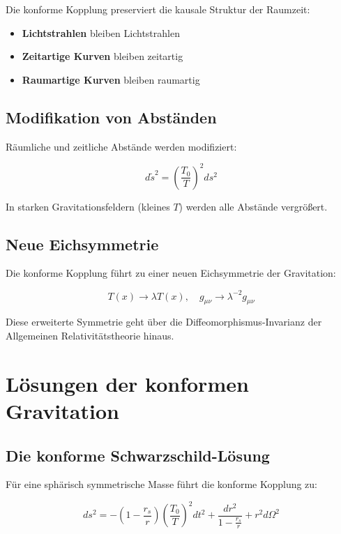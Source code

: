 \documentclass[12pt,a4paper]{report}
\begin{document}
	Die konforme Kopplung preserviert die kausale Struktur der Raumzeit:
	\begin{itemize}
		\item \textbf{Lichtstrahlen} bleiben Lichtstrahlen
		\item \textbf{Zeitartige Kurven} bleiben zeitartig
		\item \textbf{Raumartige Kurven} bleiben raumartig
	\end{itemize}
	
	\subsection{Modifikation von Abständen}
	
	Räumliche und zeitliche Abstände werden modifiziert:
	
	\begin{equation}
		d\tilde{s}^2 = \left(\frac{T_0}{T}\right)^2 ds^2
	\end{equation}
	
	In starken Gravitationsfeldern (kleines $T$) werden alle Abstände vergrößert.
	
	\subsection{Neue Eichsymmetrie}
	
	Die konforme Kopplung führt zu einer neuen Eichsymmetrie der Gravitation:
	
	\begin{equation}
		T(x) \to \lambda T(x), \quad g_{\mu\nu} \to \lambda^{-2} g_{\mu\nu}
	\end{equation}
	
	Diese erweiterte Symmetrie geht über die Diffeomorphismus-Invarianz der Allgemeinen Relativitätstheorie hinaus.
	
	\section{Lösungen der konformen Gravitation}
	
	\subsection{Die konforme Schwarzschild-Lösung}
	
	Für eine sphärisch symmetrische Masse führt die konforme Kopplung zu:
	
	\begin{equation}
		ds^2 = -\left(1-\frac{r_s}{r}\right)\left(\frac{T_0}{T}\right)^2 dt^2 + \frac{dr^2}{1-\frac{r_s}{r}} + r^2d\Omega^2
	\end{equation}
	
\end{document}
